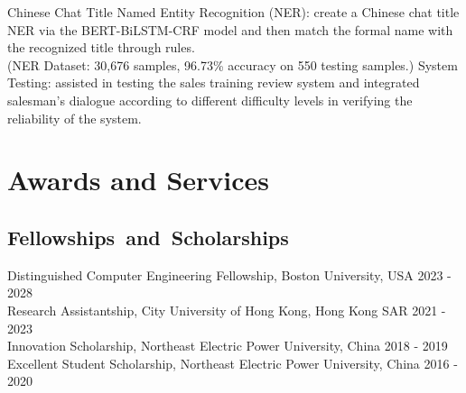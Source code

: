 \documentclass{my_cv}
\begin{document}
\workitemstwo
{Chinese Chat Title Named Entity Recognition (\textsc{NER}): create a Chinese chat title \textsc{NER} via the BERT-BiLSTM-CRF model and then match the formal name with the recognized title through rules. \\ 
(\textsc{NER} Dataset: 30,676 samples, 96.73\% accuracy on 550 testing samples.)}
{System Testing: assisted in testing the sales training review system and integrated salesman’s dialogue according to different difficulty levels in verifying the reliability of the system.}

\hspace*{\fill}


%


\section{\textbf{Awards and Services}}
\subsection{\textbf{Fellowships~and~Scholarships}}
\noindent Distinguished Computer Engineering Fellowship, Boston University, USA \hfill 2023 - 2028 \\
Research Assistantship, City University of Hong Kong, Hong Kong SAR \hfill 2021 - 2023 \\
Innovation Scholarship, Northeast Electric Power University, China \hfill 2018 - 2019\\
Excellent Student Scholarship, Northeast Electric Power University, China \hfill 2016 - 2020
\end{document}
